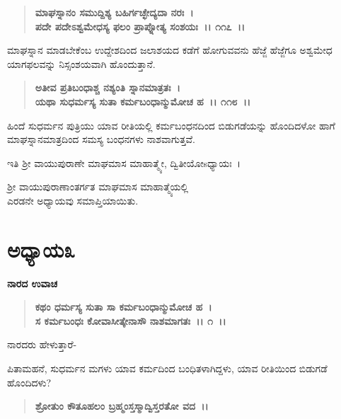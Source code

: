 \begin{verse}
\textbf{ಮಾಘಸ್ನಾನಂ ಸಮುದ್ದಿಶ್ಯ ಬಹಿರ್ಗಚ್ಛೇದ್ಯದಾ ನರಃ~।}\\\textbf{ಪದೇ ಪದೇಽಶ್ವಮೇಧಸ್ಯ ಫಲಂ ಪ್ರಾಪ್ನೋತ್ಯ ಸಂಶಯಃ~।। ೧೧೭~।।}
\end{verse}

ಮಾಘಸ್ನಾನ ಮಾಡಬೇಕೆಂಬ ಉದ್ದೇಶದಿಂದ ಜಲಾಶಯದ ಕಡೆಗೆ ಹೋಗುವವನು ಹೆಜ್ಜೆ ಹೆಜ್ಜೆಗೂ ಅಶ್ವಮೇಧ ಯಾಗಫಲವನ್ನು ನಿಸ್ಸಂಶಯವಾಗಿ ಹೊಂದುತ್ತಾನೆ.

\begin{verse}
\textbf{ಅತೀವ ಪ್ರತಿಬಂಧಾಶ್ಚ ನಶ್ಯಂತಿ ಸ್ನಾನಮಾತ್ರತಃ~।}\\\textbf{ಯಥಾ ಸುಧರ್ಮಸ್ಯ ಸುತಾ ಕರ್ಮಬಂಧಾನ್ಮುಮೋಚ ಹ~।। ೧೧೮~।।}
\end{verse}

ಹಿಂದೆ ಸುಧರ್ಮನ ಪುತ್ರಿಯು ಯಾವ ರೀತಿಯಲ್ಲಿ ಕರ್ಮಬಂಧನದಿಂದ ಬಿಡುಗಡೆಯನ್ನು ಹೊಂದಿದಳೋ ಹಾಗೆ ಮಾಘಸ್ನಾನಮಾತ್ರದಿಂದ ಸಮಸ್ಯ ಬಂಧನಗಳು ನಾಶವಾಗುತ್ತವೆ.

\begin{center}
ಇತಿ ಶ‍್ರೀ ವಾಯುಪುರಾಣೇ ಮಾಘಮಾಸ ಮಾಹಾತ್ಮ್ಯೇ, ದ್ವಿತೀಯೋsಧ್ಯಾಯಃ~।
\end{center}

\begin{center}
ಶ‍್ರೀ ವಾಯುಪುರಾಣಾಂತರ್ಗತ ಮಾಘಮಾಸ ಮಾಹಾತ್ಮ್ಯೆಯಲ್ಲಿ \\ ಎರಡನೇ ಅಧ್ಯಾಯವು ಸಮಾಪ್ತಿಯಾಯಿತು.
\end{center}

\newpage

\section*{ಅಧ್ಯಾಯ\enginline{-}೩}

\emptypage

\begin{flushleft}
\textbf{ನಾರದ ಉವಾಚ\enginline{-}}
\end{flushleft}

\begin{verse}
\textbf{ಕಥಂ ಧರ್ಮಸ್ಯ ಸುತಾ ಸಾ ಕರ್ಮಬಂಧಾನ್ಮುಮೋಚ ಹ~।}\\\textbf{ಸ ಕರ್ಮಬಂಧಃ ಕೋವಾಸೀತ್ಕೇನಾಸೌ ನಾಶಮಾಗತಃ~।। ೧~।।}
\end{verse}

\begin{flushleft}
ನಾರದರು ಹೇಳುತ್ತಾರೆ-
\end{flushleft}

ಪಿತಾಮಹನೆ, ಸುಧರ್ಮನ ಮಗಳು ಯಾವ ಕರ್ಮದಿಂದ ಬಂಧಿತಳಾಗಿದ್ದಳು, ಯಾವ ರೀತಿಯಿಂದ ಬಿಡುಗಡೆ ಹೊಂದಿದಳು?

\begin{verse}
\textbf{ಶ್ರೋತುಂ ಕೌತೂಹಲಂ ಬ್ರಹ್ಮಂಸ್ತಸ್ಮಾದ್ವಿಸ್ತರತೋ ವದ~।।}
\end{verse}

